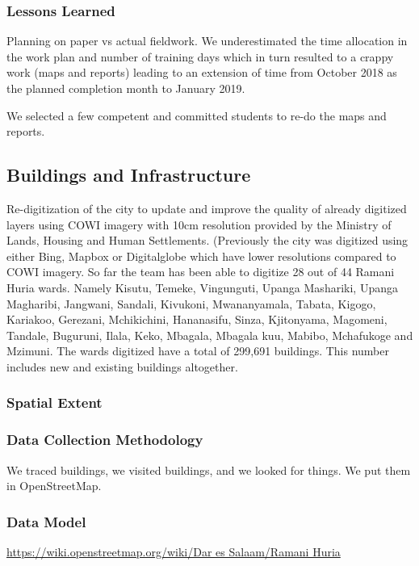 \documentclass[a4paper,12pt,twoside]{article}
\begin{document}
\subsubsection{Lessons Learned}
Planning on paper vs actual fieldwork. We underestimated the time allocation in the work plan and number of training days which in turn resulted to a crappy work (maps and reports) leading to an  extension of time from October 2018 as the planned completion month to January 2019.

\medskip
We selected a few competent and committed students to re-do the maps and reports.


\newpage
\subsection{Buildings and Infrastructure}
\begin{multicols}{2}
Re-digitization of the city to update and improve the quality of already digitized layers using COWI imagery with 10cm resolution provided by the Ministry of Lands, Housing and Human Settlements. (Previously the city was digitized using either Bing, Mapbox or Digitalglobe which have lower resolutions compared to COWI imagery. So far the team has been able to digitize 28 out of 44 Ramani Huria wards. Namely Kisutu, Temeke, Vingunguti, Upanga Mashariki, Upanga Magharibi, Jangwani, Sandali, Kivukoni, Mwananyamala, Tabata, Kigogo, Kariakoo, Gerezani, Mchikichini, Hananasifu, Sinza, Kjitonyama, Magomeni, Tandale, Buguruni, Ilala, Keko, Mbagala, Mbagala kuu, Mabibo, Mchafukoge and Mzimuni. The wards digitized have a total of 299,691 buildings. This number includes new and existing buildings altogether.
\end{multicols}

\subsubsection{Spatial Extent}

\subsubsection{Data Collection Methodology}

We traced buildings, we visited buildings, and we looked for things. We put them in OpenStreetMap.

\subsubsection{Data Model}
\href{https://wiki.openstreetmap.org/wiki/Dar_es_Salaam/Ramani_Huria}{https://wiki.openstreetmap.org/wiki/Dar es Salaam/Ramani Huria}
\end{document}
